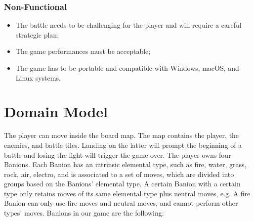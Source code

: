 \documentclass[12pt, a4paper]{report}
\theoremstyle{definition}
\begin{document}
\subsubsection{Non-Functional}

\begin{itemize}
    \item The battle needs to be challenging for the player and will require a careful strategic plan; \label{challengingbattle}
    \item The game performances must be acceptable;
    \item The game has to be portable and compatible with Windows, macOS, and Linux systems.
\end{itemize}

\section{Domain Model}

    The player can move inside the board map. The map contains the player, the enemies, and battle tiles.
    Landing on the latter will prompt the beginning of a battle and losing the fight will trigger the game over.
    The player owns four Banions. Each Banion has an intrinsic elemental type, such as fire, water, grass, rock, air, electro,
    and is associated to a set of moves, which are divided into groups based on the Banions' elemental type. A certain Banion with a certain
    type only retains moves of its same elemental type plus neutral moves, e.g. A fire Banion can only use fire moves and neutral moves,
    and cannot perform other types' moves.
    Banions in our game are the following:
\end{document}
